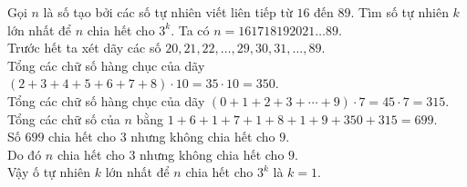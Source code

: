 \begin{bt}%
 Gọi $n$ là số tạo bởi các số tự nhiên viết liên tiếp từ $16$ đến $89$. Tìm số tự nhiên $k$ lớn nhất để $n$ chia hết cho $3^k$.
 \loigiai
  {
  Ta có $n=161718192021\ldots89$.\\
  Trước hết ta xét dãy các số $20,21,22,\ldots,29,30,31,\ldots,89$.\\
  Tổng các chữ số hàng chục của dãy $(2+3+4+5+6+7+8)\cdot 10 = 35 \cdot 10 = 350$.\\
  Tổng các chữ số hàng chục của dãy $(0+1+2+3+\cdots+9)\cdot 7 = 45 \cdot 7 = 315$.\\
  Tổng các chữ số của $n$ bằng $1+6+1+7+1+8+1+9+350+315=699$.\\
  Số $699$ chia hết cho $3$ nhưng không chia hết cho $9$.\\
  Do đó $n$ chia hết cho $3$ nhưng không chia hết cho $9$.\\
  Vậy ố tự nhiên $k$ lớn nhất để $n$ chia hết cho $3^k$ là $k=1$.
  }
\end{bt}

